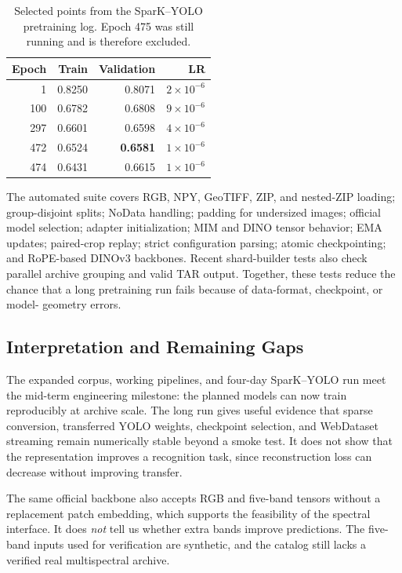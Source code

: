 \documentclass[10pt,twocolumn,letterpaper]{article}
\begin{document}
\begin{table}[t]
\centering
\caption{Selected points from the SparK--YOLO pretraining log. Epoch 475 was
still running and is therefore excluded.}
\label{tab:spark-run}
\small
\begin{tabular}{rrrr}
\toprule
Epoch & Train & Validation & LR \\
\midrule
1   & 0.8250 & 0.8071 & $2\!\times\!10^{-6}$ \\
100 & 0.6782 & 0.6808 & $9\!\times\!10^{-6}$ \\
297 & 0.6601 & 0.6598 & $4\!\times\!10^{-6}$ \\
472 & 0.6524 & \textbf{0.6581} & $1\!\times\!10^{-6}$ \\
474 & 0.6431 & 0.6615 & $1\!\times\!10^{-6}$ \\
\bottomrule
\end{tabular}
\end{table}
The automated suite covers RGB, NPY, GeoTIFF, ZIP, and nested-ZIP loading;
group-disjoint splits; NoData handling; padding for undersized images; official
model selection; adapter initialization; MIM and DINO tensor behavior; EMA
updates; paired-crop replay; strict configuration parsing; atomic checkpointing;
and RoPE-based DINOv3 backbones. Recent shard-builder tests also check parallel
archive grouping and valid TAR output. Together, these tests reduce the chance
that a long pretraining run fails because of data-format, checkpoint, or model-
geometry errors.

\subsection{Interpretation and Remaining Gaps}
The expanded corpus, working pipelines, and four-day SparK--YOLO run meet the
mid-term engineering milestone: the planned models can now train reproducibly at
archive scale. The long run gives useful evidence that sparse conversion,
transferred YOLO weights, checkpoint selection, and WebDataset streaming remain
numerically stable beyond a smoke test. It does not show that the representation
improves a recognition task, since reconstruction loss can decrease without
improving transfer.

The same official backbone also accepts RGB and five-band tensors without a
replacement patch embedding, which supports the feasibility of the spectral
interface. It does \emph{not} tell us whether extra bands improve predictions.
The five-band inputs used for verification are synthetic, and the catalog still
lacks a verified real multispectral archive.
\end{document}
